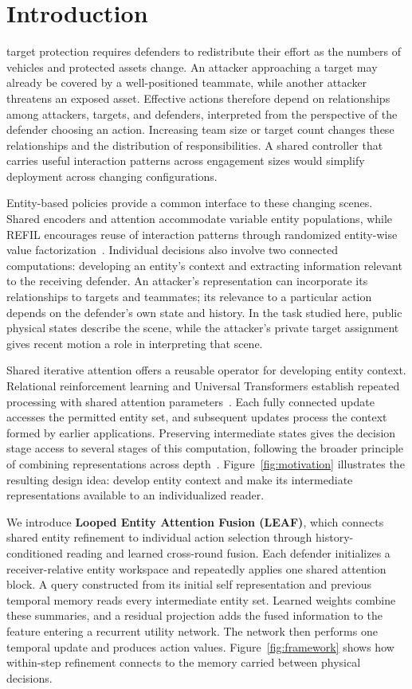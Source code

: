 \section{Introduction}
 target protection requires defenders to redistribute their effort as the numbers of vehicles and protected assets change. An attacker approaching a target may already be covered by a well-positioned teammate, while another attacker threatens an exposed asset. Effective actions therefore depend on relationships among attackers, targets, and defenders, interpreted from the perspective of the defender choosing an action. Increasing team size or target count changes these relationships and the distribution of responsibilities. A shared controller that carries useful interaction patterns across engagement sizes would simplify deployment across changing configurations.

Entity-based policies provide a common interface to these changing scenes. Shared encoders and attention accommodate variable entity populations, while REFIL encourages reuse of interaction patterns through randomized entity-wise value factorization~\cite{iqbal2021refil}. Individual decisions also involve two connected computations: developing an entity's context and extracting information relevant to the receiving defender. An attacker's representation can incorporate its relationships to targets and teammates; its relevance to a particular action depends on the defender's own state and history. In the task studied here, public physical states describe the scene, while the attacker's private target assignment gives recent motion a role in interpreting that scene.

Shared iterative attention offers a reusable operator for developing entity context. Relational reinforcement learning and Universal Transformers establish repeated processing with shared attention parameters~\cite{zambaldi2019relational,dehghani2019universal}. Each fully connected update accesses the permitted entity set, and subsequent updates process the context formed by earlier applications. Preserving intermediate states gives the decision stage access to several stages of this computation, following the broader principle of combining representations across depth~\cite{xu2018jk}. Figure~\ref{fig:motivation} illustrates the resulting design idea: develop entity context and make its intermediate representations available to an individualized reader.

We introduce \textbf{Looped Entity Attention Fusion (LEAF)}, which connects shared entity refinement to individual action selection through history-conditioned reading and learned cross-round fusion. Each defender initializes a receiver-relative entity workspace and repeatedly applies one shared attention block. A query constructed from its initial self representation and previous temporal memory reads every intermediate entity set. Learned weights combine these summaries, and a residual projection adds the fused information to the feature entering a recurrent utility network. The network then performs one temporal update and produces action values. Figure~\ref{fig:framework} shows how within-step refinement connects to the memory carried between physical decisions.

